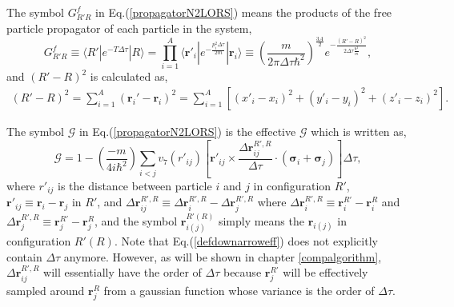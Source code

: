\documentclass[12pt,letterpaper,UTF8]{report}
\begin{document}
The symbol $G^f_{R'R}$ in Eq.(\ref{propagatorN2LORS}) means the products of the free particle propagator of each particle in the system,
\begin{equation}
G^f_{R'R}  \equiv
\langle R' | e^{-T \Delta \tau}  | R \rangle
= \prod_{i=1}^{A}  \langle \bm{r}'_i | e^{-\frac{p_i^2 \Delta \tau}{2m}    } | \bm{r}_i \rangle
\equiv  \left( \frac{m}{2\pi \Delta \tau \hbar^2} \right)^{\frac{3A}{2}}  e^{  -\frac{ (R'-R)^2 }{2 \Delta \tau \frac{\hbar^2}{m}}  } ,
\label{propagatorFree}
\end{equation}
and $(R'-R)^2$ is calculated as,
\begin{eqnarray}
\!\!\!\!\! (R'\!-\!R)^2 \!  = \!
\sum_{i=1}^A  (\bm{r}_i'-\bm{r}_i)^2
=\sum_{i=1}^A \left[ (x'_i\!-\!x_i)^2 \!+\! (y'_i\!-\!y_i)^2 \!+\! (z'_i\!-\!z_i)^2 \right] . \label{Rdiffdef}
\end{eqnarray}

The symbol $\bm{\mathcal{G}}$ in Eq.(\ref{propagatorN2LORS}) is the effective $\mathcal{G}$ which is written as,
\begin{equation}
\bm{\mathcal{G}} =
1 - \left(\frac{-m}{4i  \hbar^2 } \right)\sum_{i<j} v_7(r'_{ij}) \left[ \bm{r}'_{ij} \times \frac{\Delta \bm{r}^{R',R}_{ij}}{\Delta \tau}
\cdot (\bm{\sigma}_i+\bm{\sigma}_j) \right] \Delta \tau  ,
\label{defdownarroweff}
\end{equation}
where $r'_{ij}$ is the distance between particle $i$ and $j$ in configuration $R'$,
$\bm{r}'_{ij}\equiv \bm{r}_i-\bm{r}_j$ in $R'$,
and
$\Delta \bm{r}^{R',R}_{ij} \equiv \Delta \bm{r}^{R',R}_i-\Delta \bm{r}^{R',R}_j $
where $\Delta \bm{r}^{R',R}_i \equiv \bm{r}^{R'}_i - \bm{r}^R_i $
and
$\Delta \bm{r}^{R',R}_j \equiv \bm{r}^{R'}_j - \bm{r}^R_j $,
and the symbol $\bm{r}^{R'(R)}_{i(j)}$ simply means the $\bm{r}_{i(j)}$ in configuration $R'(R)$.
Note that Eq.(\ref{defdownarroweff}) does not explicitly contain $\Delta \tau$ anymore.
However, as will be shown in chapter \ref{compalgorithm}, $\Delta \bm{r}^{R',R}_{ij}$ will essentially have the order of $\Delta \tau$ because $\bm{r}^{R'}_j$ will be effectively sampled around $\bm{r}^{R}_j$ from a gaussian function whose variance is the order of $\Delta \tau$.
\end{document}
